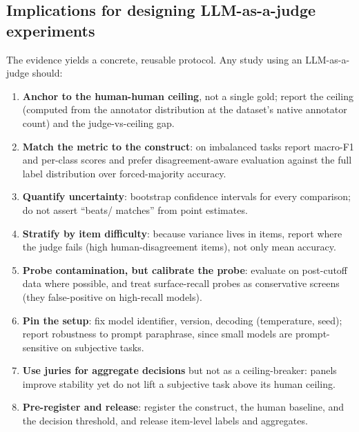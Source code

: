 \subsection{Implications for designing LLM-as-a-judge experiments}
The evidence yields a concrete, reusable protocol. Any study using an LLM-as-a-judge should:
\begin{enumerate}[leftmargin=1.5em,itemsep=2pt]
\item \textbf{Anchor to the human-human ceiling}, not a single gold; report the ceiling (computed from the annotator
distribution at the dataset's native annotator count) and the judge-vs-ceiling gap.
\item \textbf{Match the metric to the construct}: on imbalanced tasks report macro-F1 and per-class scores and
prefer disagreement-aware evaluation against the full label distribution over forced-majority accuracy.
\item \textbf{Quantify uncertainty}: bootstrap confidence intervals for every comparison; do not assert ``beats/
matches'' from point estimates.
\item \textbf{Stratify by item difficulty}: because variance lives in items, report where the judge fails (high
human-disagreement items), not only mean accuracy.
\item \textbf{Probe contamination, but calibrate the probe}: evaluate on post-cutoff data where possible, and treat
surface-recall probes as conservative screens (they false-positive on high-recall models).
\item \textbf{Pin the setup}: fix model identifier, version, decoding (temperature, seed); report robustness to
prompt paraphrase, since small models are prompt-sensitive on subjective tasks.
\item \textbf{Use juries for aggregate decisions} but not as a ceiling-breaker: panels improve stability yet do not
lift a subjective task above its human ceiling.
\item \textbf{Pre-register and release}: register the construct, the human baseline, and the decision threshold, and
release item-level labels and aggregates.
\end{enumerate}

